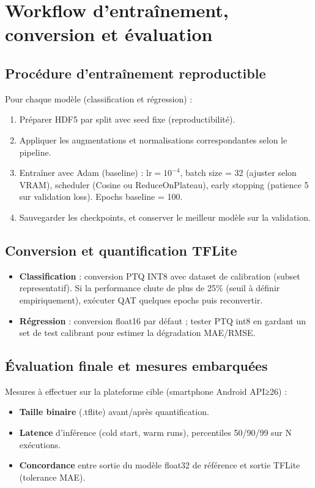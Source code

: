 \section{Workflow d'entraînement, conversion et évaluation}

\subsection{Procédure d'entraînement reproductible}

Pour chaque modèle (classification et régression) :
\begin{enumerate}
	\item Préparer HDF5 par split avec seed fixe (reproductibilité).
	\item Appliquer les augmentations et normalisations correspondantes selon le pipeline.
	\item Entraîner avec Adam (baseline) : $\mathrm{lr}=10^{-4}$, batch size = 32 (ajuster selon VRAM), scheduler (Cosine ou ReduceOnPlateau), early stopping (patience 5 sur validation loss). Epochs baseline = 100.
	\item Sauvegarder les checkpoints, et conserver le meilleur modèle sur la validation.
\end{enumerate}

\subsection{Conversion et quantification TFLite}

\begin{itemize}
	\item \textbf{Classification} : conversion PTQ INT8 avec dataset de calibration (subset representatif). Si la performance chute de plus de 25\% (seuil à définir empiriquement), exécuter QAT quelques epochs puis reconvertir.
	\item \textbf{Régression} : conversion float16 par défaut ; tester PTQ int8 en gardant un set de test calibrant pour estimer la dégradation MAE/RMSE.
\end{itemize}

\subsection{Évaluation finale et mesures embarquées}

Mesures à effectuer sur la plateforme cible (smartphone Android API≥26) :
\begin{itemize}
	\item \textbf{Taille binaire} (.tflite) avant/après quantification.
	\item \textbf{Latence} d'inférence (cold start, warm runs), percentiles 50/90/99 sur N exécutions.
	\item \textbf{Concordance} entre sortie du modèle float32 de référence et sortie TFLite (tolerance MAE).
\end{itemize}

